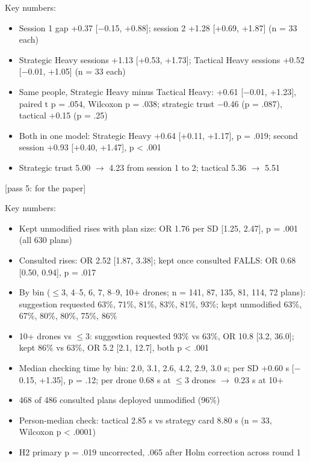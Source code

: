 \begin{options}
\noindent Key numbers:\begin{itemize}[leftmargin=1.2em,itemsep=0pt]\footnotesize
\item Session 1 gap +0.37 [$-$0.15, +0.88]; session 2 +1.28 [+0.69, +1.87] (n = 33 each)
\item Strategic Heavy sessions +1.13 [+0.53, +1.73]; Tactical Heavy sessions +0.52 [$-$0.01, +1.05] (n = 33 each)
\item Same people, Strategic Heavy minus Tactical Heavy: +0.61 [$-$0.01, +1.23], paired t p = .054, Wilcoxon p = .038; strategic trust $-$0.46 (p = .087), tactical +0.15 (p = .25)
\item Both in one model: Strategic Heavy +0.64 [+0.11, +1.17], p = .019; second session +0.93 [+0.40, +1.47], p < .001
\item Strategic trust 5.00 $\rightarrow$ 4.23 from session 1 to 2; tactical 5.36 $\rightarrow$ 5.51
\end{itemize}

 {\footnotesize [pass 5: for the paper]}

\noindent Key numbers:\begin{itemize}[leftmargin=1.2em,itemsep=0pt]\footnotesize
\item Kept unmodified rises with plan size: OR 1.76 per SD [1.25, 2.47], p = .001 (all 630 plans)
\item Consulted rises: OR 2.52 [1.87, 3.38]; kept once consulted FALLS: OR 0.68 [0.50, 0.94], p = .017
\item By bin ($\leq$3, 4--5, 6, 7, 8--9, 10+ drones; n = 141, 87, 135, 81, 114, 72 plans): suggestion requested 63\%, 71\%, 81\%, 83\%, 81\%, 93\%; kept unmodified 63\%, 67\%, 80\%, 80\%, 75\%, 86\%
\item 10+ drones vs $\leq$3: suggestion requested 93\% vs 63\%, OR 10.8 [3.2, 36.0]; kept 86\% vs 63\%, OR 5.2 [2.1, 12.7], both p < .001
\item Median checking time by bin: 2.0, 3.1, 2.6, 4.2, 2.9, 3.0 s; per SD +0.60 s [$-$0.15, +1.35], p = .12; per drone 0.68 s at $\leq$3 drones $\rightarrow$ 0.23 s at 10+
\item 468 of 486 consulted plans deployed unmodified (96\%)
\item Person-median check: tactical 2.85 s vs strategy card 8.80 s (n = 33, Wilcoxon p < .0001)
\item H2 primary p = .019 uncorrected, .065 after Holm correction across round 1
\end{itemize}


\end{options}
